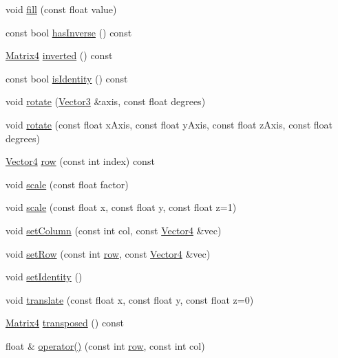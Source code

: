\begin{DoxyCompactItemize}
\item 
void \hyperlink{classprism_1_1_matrix4_a250d014842d71975bdfe34443703d090}{fill} (const float value)
\item 
const bool \hyperlink{classprism_1_1_matrix4_af9da747da374bbcb3c1eb86888445a04}{has\+Inverse} () const 
\item 
\hyperlink{classprism_1_1_matrix4}{Matrix4} \hyperlink{classprism_1_1_matrix4_a9fd394a4623bf877c816d3ee32a65398}{inverted} () const 
\item 
const bool \hyperlink{classprism_1_1_matrix4_a5e194c959cdab2ae9c0aa3a012aea3f5}{is\+Identity} () const 
\item 
void \hyperlink{classprism_1_1_matrix4_a069ba54a3d94b97ba73a067b677cb2dc}{rotate} (\hyperlink{classprism_1_1_vector3}{Vector3} \&axis, const float degrees)
\item 
void \hyperlink{classprism_1_1_matrix4_a633a54c0577f3119a5f27223df0945e4}{rotate} (const float x\+Axis, const float y\+Axis, const float z\+Axis, const float degrees)
\item 
\hyperlink{classprism_1_1_vector4}{Vector4} \hyperlink{classprism_1_1_matrix4_a3915b1b0eae6e7bd4aefcec1dd3d863a}{row} (const int index) const 
\item 
void \hyperlink{classprism_1_1_matrix4_a0157b4bb139f75e976ac56b33050c2f5}{scale} (const float factor)
\item 
void \hyperlink{classprism_1_1_matrix4_af25057a3429811c2bd0b2993fec88f30}{scale} (const float x, const float y, const float z=1)
\item 
void \hyperlink{classprism_1_1_matrix4_a06679d8db408ff8224f458f1043fb7d4}{set\+Column} (const int col, const \hyperlink{classprism_1_1_vector4}{Vector4} \&vec)
\item 
void \hyperlink{classprism_1_1_matrix4_a5c2b6f016995575308091c7e79554ea8}{set\+Row} (const int \hyperlink{classprism_1_1_matrix4_a3915b1b0eae6e7bd4aefcec1dd3d863a}{row}, const \hyperlink{classprism_1_1_vector4}{Vector4} \&vec)
\item 
void \hyperlink{classprism_1_1_matrix4_af1be8b0e450e975534b7c1bbedb2dadc}{set\+Identity} ()
\item 
void \hyperlink{classprism_1_1_matrix4_a641fbb2e58403f03f18295afac0a028a}{translate} (const float x, const float y, const float z=0)
\item 
\hyperlink{classprism_1_1_matrix4}{Matrix4} \hyperlink{classprism_1_1_matrix4_a69fd0bae9a82c8fd6ef6437c91f37fab}{transposed} () const 
\item 
float \& \hyperlink{classprism_1_1_matrix4_a6415d46405799de0c92b91f227a77631}{operator()} (const int \hyperlink{classprism_1_1_matrix4_a3915b1b0eae6e7bd4aefcec1dd3d863a}{row}, const int col)

\end{DoxyCompactItemize}

